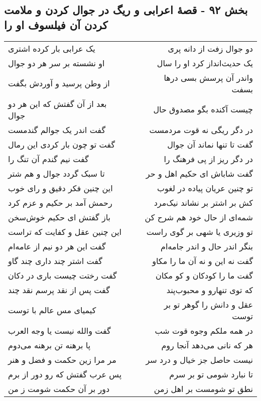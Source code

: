 \begin{center}
\section*{بخش ۹۲ - قصهٔ اعرابی و ریگ در جوال کردن و ملامت کردن آن فیلسوف او را}
\label{sec:sh092}
\begin{longtable}{l p{0.5cm} r}
یک عرابی بار کرده اشتری
&&
دو جوال زفت از دانه پری
\\
او نشسته بر سر هر دو جوال
&&
یک حدیث‌انداز کرد او را سال
\\
از وطن پرسید و آوردش بگفت
&&
واندر آن پرسش بسی درها بسفت
\\
بعد از آن گفتش که این هر دو جوال
&&
چیست آکنده بگو مصدوق حال
\\
گفت اندر یک جوالم گندمست
&&
در دگر ریگی نه قوت مردمست
\\
گفت تو چون بار کردی این رمال
&&
گفت تا تنها نماند آن جوال
\\
گفت نیم گندم آن تنگ را
&&
در دگر ریز از پی فرهنگ را
\\
تا سبک گردد جوال و هم شتر
&&
گفت شاباش ای حکیم اهل و حر
\\
این چنین فکر دقیق و رای خوب
&&
تو چنین عریان پیاده در لغوب
\\
رحمش آمد بر حکیم و عزم کرد
&&
کش بر اشتر بر نشاند نیک‌مرد
\\
باز گفتش ای حکیم خوش‌سخن
&&
شمه‌ای از حال خود هم شرح کن
\\
این چنین عقل و کفایت که تراست
&&
تو وزیری یا شهی بر گوی راست
\\
گفت این هر دو نیم از عامه‌ام
&&
بنگر اندر حال و اندر جامه‌ام
\\
گفت اشتر چند داری چند گاو
&&
گفت نه این و نه آن ما را مکاو
\\
گفت رختت چیست باری در دکان
&&
گفت ما را کودکان و کو مکان
\\
گفت پس از نقد پرسم نقد چند
&&
که توی تنهارو و محبوب‌پند
\\
کیمیای مس عالم با توست
&&
عقل و دانش را گوهر تو بر توست
\\
گفت والله نیست یا وجه العرب
&&
در همه ملکم وجوه قوت شب
\\
پا برهنه تن برهنه می‌دوم
&&
هر که نانی می‌دهد آنجا روم
\\
مر مرا زین حکمت و فضل و هنر
&&
نیست حاصل جز خیال و درد سر
\\
پس عرب گفتش که رو دور از برم
&&
تا نبارد شومی تو بر سرم
\\
دور بر آن حکمت شومت ز من
&&
نطق تو شومست بر اهل زمن
\\

\end{longtable}
\end{center}
